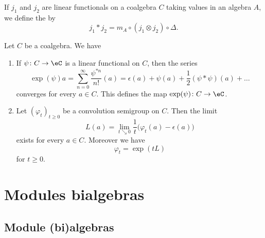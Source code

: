 \begin{definition}
	If $j_1$ and $j_2$ are linear functionals on a coalgebra $C$ taking values in an algebra $A$, we define the  by
	\begin{equation}
		j_1*j_2=m_A\circ(j_1\otimes j_2)\circ\Delta.
	\end{equation}
\end{definition}

\begin{lemma}
	Let $C$ be a coalgebra. We have
	\begin{enumerate}
		\item
			If $\psi\colon C\to \eC$ is a linear functional on $C$, then the series
			\begin{equation}
				\exp(\psi)a=\sum_{n=0}^{\infty}\frac{ \psi^{*n} }{ n! }(a)=\epsilon(a)+\psi(a)+\frac{ 1 }{2}(\psi *\psi)(a)+\ldots
			\end{equation}
			converges for every $a\in C$. This defines the map $\exp(\psi)\colon C\to \eC$.
		\item
			Let $(\varphi_t)_{t\geq 0}$ be a convolution semigroup on $C$. Then the limit
			\begin{equation}
				L(a)=\lim_{t\searrow 0} \frac{1}{ t }\big( \varphi_t(a)-\epsilon(a) \big)
			\end{equation}
			exists for every $a\in C$. Moreover we have
			\begin{equation}
				\varphi_t=\exp(tL)
			\end{equation}
			for $t\geq 0$.
	\end{enumerate}
\end{lemma}

\section{Modules bialgebras}


\subsection{Module (bi)algebras}
\label{subSecModulebialgebra}


